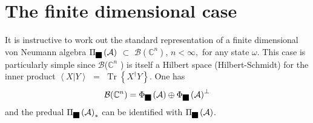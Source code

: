 \documentclass[aps,preprint]{revtex4}%
\providecommand{\U}[1]{\protect\rule{.1in}{.1in}}
\begin{document}
\section{The finite dimensional case}

It is instructive to work out the standard representation of a finite
dimensional von Neumann algebra $\Pi_{\U{3c9} }\left(  \mathcal{A}\right)  $
$\subset$ $\mathcal{B}(\mathbb{C}^{n})$, $n<\infty,$ for any state $\omega$.
This case is particularly simple since $\mathcal{B}$($\mathbb{C}^{n}$ ) is
itself a Hilbert space (Hilbert-Schmidt) for the inner product $\left\langle
X|Y\right\rangle $ $=$ $\operatorname{Tr}\left\{  X^{\dagger}Y\right\}  $. One
has
\begin{equation}
\mathcal{B}(\mathbb{C}^{n})=\Phi_{\U{3c9} }\left(  \mathcal{A}\right)
\oplus\Phi_{\U{3c9} }\left(  \mathcal{A}\right)  ^{\perp}%
\end{equation}
and the predual $\Pi_{\U{3c9} }\left(  \mathcal{A}\right)  _{\ast}$ can be
identified with $\Pi_{\U{3c9} }\left(  \mathcal{A}\right)  $.
\end{document}
